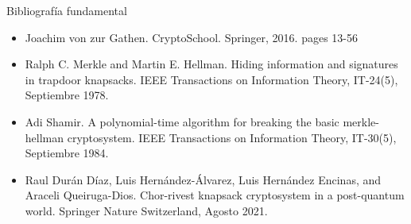 \documentclass{beamer}
\begin{document}
        \begin{frame}{Bibliografía fundamental}
            \begin{itemize}
                \item Joachim von zur Gathen. CryptoSchool. Springer, 2016. pages 13-56
                \item Ralph C. Merkle and Martin E. Hellman. Hiding information and signatures in trapdoor knapsacks. IEEE Transactions on Information Theory, IT-24(5), Septiembre 1978.
                \item Adi Shamir. A polynomial-time algorithm for breaking the basic merkle-hellman cryptosystem. IEEE Transactions on Information Theory, IT-30(5), Septiembre 1984.
                \item Raul Durán Díaz, Luis Hernández-Álvarez, Luis Hernández Encinas, and Araceli Queiruga-Dios. Chor-rivest knapsack cryptosystem in a post-quantum world. Springer Nature Switzerland, Agosto 2021.
            \end{itemize}
        \end{frame}
    
\end{document}
